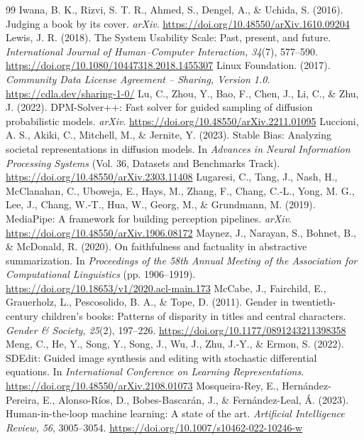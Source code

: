 \documentclass[10pt,a4paper,twocolumn]{article}
\begin{document}
{\begin{thebibliography}{99}
 Iwana, B. K., Rizvi, S. T. R., Ahmed, S., Dengel, A., \& Uchida, S. (2016). Judging a book by its cover. \emph{arXiv}. \url{https://doi.org/10.48550/arXiv.1610.09204}
 Lewis, J. R. (2018). The System Usability Scale: Past, present, and future. \emph{International Journal of Human--Computer Interaction, 34}(7), 577--590. \url{https://doi.org/10.1080/10447318.2018.1455307}
 Linux Foundation. (2017). \emph{Community Data License Agreement -- Sharing, Version 1.0}. \url{https://cdla.dev/sharing-1-0/}
 Lu, C., Zhou, Y., Bao, F., Chen, J., Li, C., \& Zhu, J. (2022). DPM-Solver++: Fast solver for guided sampling of diffusion probabilistic models. \emph{arXiv}. \url{https://doi.org/10.48550/arXiv.2211.01095}
 Luccioni, A. S., Akiki, C., Mitchell, M., \& Jernite, Y. (2023). Stable Bias: Analyzing societal representations in diffusion models. In \emph{Advances in Neural Information Processing Systems} (Vol. 36, Datasets and Benchmarks Track). \url{https://doi.org/10.48550/arXiv.2303.11408}
 Lugaresi, C., Tang, J., Nash, H., McClanahan, C., Uboweja, E., Hays, M., Zhang, F., Chang, C.-L., Yong, M. G., Lee, J., Chang, W.-T., Hua, W., Georg, M., \& Grundmann, M. (2019). MediaPipe: A framework for building perception pipelines. \emph{arXiv}. \url{https://doi.org/10.48550/arXiv.1906.08172}
 Maynez, J., Narayan, S., Bohnet, B., \& McDonald, R. (2020). On faithfulness and factuality in abstractive summarization. In \emph{Proceedings of the 58th Annual Meeting of the Association for Computational Linguistics} (pp. 1906--1919). \url{https://doi.org/10.18653/v1/2020.acl-main.173}
 McCabe, J., Fairchild, E., Grauerholz, L., Pescosolido, B. A., \& Tope, D. (2011). Gender in twentieth-century children's books: Patterns of disparity in titles and central characters. \emph{Gender \& Society, 25}(2), 197--226. \url{https://doi.org/10.1177/0891243211398358}
 Meng, C., He, Y., Song, Y., Song, J., Wu, J., Zhu, J.-Y., \& Ermon, S. (2022). SDEdit: Guided image synthesis and editing with stochastic differential equations. In \emph{International Conference on Learning Representations}. \url{https://doi.org/10.48550/arXiv.2108.01073}
 Mosqueira-Rey, E., Hernández-Pereira, E., Alonso-Ríos, D., Bobes-Bascarán, J., \& Fernández-Leal, Á. (2023). Human-in-the-loop machine learning: A state of the art. \emph{Artificial Intelligence Review, 56}, 3005--3054. \url{https://doi.org/10.1007/s10462-022-10246-w}

\end{thebibliography}}
\end{document}
